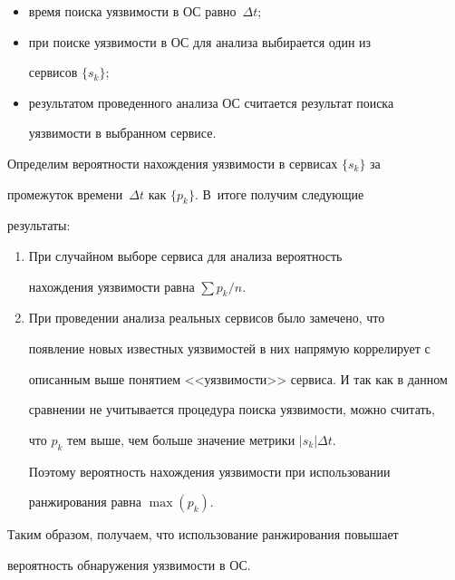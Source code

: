   \begin{itemize}


\item время поиска уязвимости в ОС равно~$\Delta t$;


\item при поиске уязвимости в ОС для анализа выбирается один из 


сервисов $\{s_k\}$;


\item результатом проведенного анализа ОС считается результат поиска 


уязвимости в выбранном сервисе.


\end{itemize}





  Определим вероятности нахождения уязвимости в сервисах $\{s_k\}$ за 


промежуток времени~$\Delta t$ как $\{p_k\}$. В~итоге получим следующие 


результаты:


  \begin{enumerate}[1.]


  \item При случайном выборе сервиса для анализа вероятность 


нахождения уязвимости равна  $\sum p_k/n$.


  \item При проведении анализа реальных сервисов было замечено, что 


появление новых известных уязвимостей в них напрямую коррелирует с 


описанным выше понятием <<уязвимости>> сервиса. И так как в данном 


сравнении не учитывается процедура поиска уязвимости, можно считать, 


что $p_k$ тем выше, чем больше значение метрики $\vert s_k\vert\Delta t$. 


Поэтому вероятность нахождения уязвимости при использовании 


ранжирования равна $\max (p_k)$.


\end{enumerate}


  


  Таким образом, получаем, что использование ранжирования повышает 


вероятность обнаружения уязвимости в ОС.


